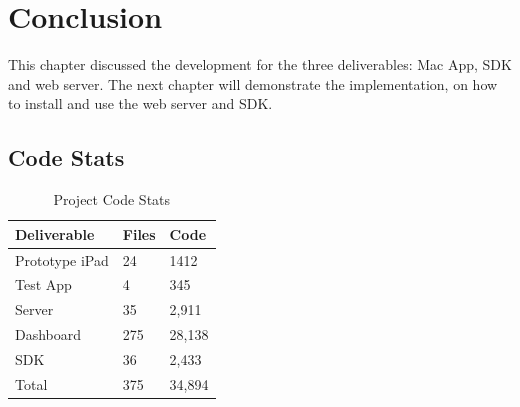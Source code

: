 \section{Conclusion}

This chapter discussed the development for the three deliverables: Mac App, SDK and web server. The next chapter will demonstrate the implementation, on how to install and use the web server and SDK. 

\subsection{Code Stats}

\begin{table}[!h]
\centering
\caption{Project Code Stats}
\label{my-label}
\begin{tabular}{|l|l|l|}
\hline
\rowcolor{green!20}
Deliverable & Files & Code   \\ \hline
Prototype iPad & 24 & 1412 \\ \hline
Test App & 4 & 345 \\ \hline
Server      & 35    & 2,911  \\ \hline
Dashboard   & 275   & 28,138 \\ \hline
SDK         & 36    & 2,433  \\ \hline
Total       & 375   & 34,894 \\ \hline
\end{tabular}
\end{table}